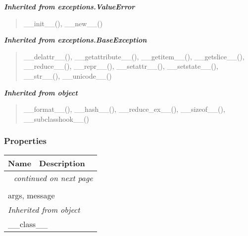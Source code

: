 \large{\textbf{\textit{Inherited from exceptions.ValueError}}}

\begin{quote}
\_\_init\_\_(), \_\_new\_\_()
\end{quote}

\large{\textbf{\textit{Inherited from exceptions.BaseException}}}

\begin{quote}
\_\_delattr\_\_(), \_\_getattribute\_\_(), \_\_getitem\_\_(), \_\_getslice\_\_(), \_\_reduce\_\_(), \_\_repr\_\_(), \_\_setattr\_\_(), \_\_setstate\_\_(), \_\_str\_\_(), \_\_unicode\_\_()
\end{quote}

\large{\textbf{\textit{Inherited from object}}}

\begin{quote}
\_\_format\_\_(), \_\_hash\_\_(), \_\_reduce\_ex\_\_(), \_\_sizeof\_\_(), \_\_subclasshook\_\_()
\end{quote}


  \subsubsection{Properties}

    \vspace{-1cm}
\hspace{\varindent}\begin{longtable}{|p{\varnamewidth}|p{\vardescrwidth}|l}
\cline{1-2}
\cline{1-2} \centering \textbf{Name} & \centering \textbf{Description}& \\
\cline{1-2}
\endhead\cline{1-2}\multicolumn{3}{r}{\small\textit{continued on next page}}\\\endfoot\cline{1-2}
\endlastfoot\multicolumn{2}{|l|}{\textit{Inherited from exceptions.BaseException}}\\
\multicolumn{2}{|p{\varwidth}|}{\raggedright args, message}\\
\cline{1-2}
\multicolumn{2}{|l|}{\textit{Inherited from object}}\\
\multicolumn{2}{|p{\varwidth}|}{\raggedright \_\_class\_\_}\\
\cline{1-2}
\end{longtable}


